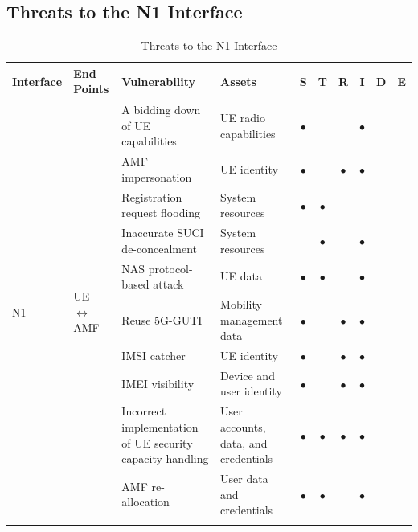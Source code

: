\documentclass{report}
\begin{document}
\subsection{Threats to the N1 Interface}
\begin{table}[H]
        \centering
        \caption{Threats to the N1 Interface \cite{mahyoub2024security}}
        \label{tab:threats_summary}
        
        \renewcommand{\arraystretch}{1.2} 
        \setlength{\tabcolsep}{5pt} 
        \begin{tabularx}{\textwidth}{|l|l|X|X|c|c|c|c|c|c|}
        \hline
        \textbf{Interface} & \textbf{End Points} & \textbf{Vulnerability} & \textbf{Assets} & \textbf{S} & \textbf{T} & \textbf{R} & \textbf{I} & \textbf{D} & \textbf{E} \\ 
        \hline
        \multirow{19}{*}{N1} 
           & \multirow{19}{*}{UE $\leftrightarrow$ AMF} & A bidding down of UE capabilities & UE radio capabilities & $\bullet$ &  &  & $\bullet$ &  &  \\ \cline{3-10}
           &                          & AMF impersonation & UE identity & $\bullet$ &  & $\bullet$ & $\bullet$ &  &  \\ \cline{3-10}
           &                          & Registration request flooding & System resources & $\bullet$ & $\bullet$ &  &  &  &  \\ \cline{3-10}
           &                          & Inaccurate SUCI de-concealment & System resources &  & $\bullet$ &  & $\bullet$ &  &  \\ \cline{3-10}
           &                          & NAS protocol-based attack & UE data & $\bullet$ & $\bullet$ &  & $\bullet$ &  &  \\ \cline{3-10}
           &                          & Reuse 5G-GUTI & Mobility management data & $\bullet$ &  & $\bullet$ & $\bullet$ &  &  \\ \cline{3-10}
           &                          & IMSI catcher & UE identity & $\bullet$ &  & $\bullet$ & $\bullet$ &  &  \\ \cline{3-10}
           &                          & IMEI visibility & Device and user identity & $\bullet$ &  & $\bullet$ & $\bullet$ &  &  \\ \cline{3-10}
           &                          & Incorrect implementation of UE security capacity handling & User accounts, data, and credentials & $\bullet$ & $\bullet$ & $\bullet$ & $\bullet$ &  &  \\ \cline{3-10}
           &                          & AMF re-allocation & User data and credentials & $\bullet$ & $\bullet$ &  & $\bullet$ &  &  \\ \cline{3-10}

\end{tabularx}
\end{table}
\end{document}
